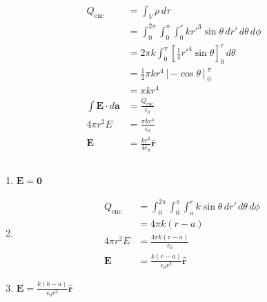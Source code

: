 \documentclass{article}
\renewcommand{\vec}[1]{\boldsymbol{\mathbf{#1}}}
\newcommand{\uvec}[1]{\hat{\vec{#1}}}
\begin{document}
\subsection{}

\begin{align*}
  Q_\text{enc}                 & = \int_V \rho \,d \tau                                                             \\
                               & = \int_0^{2 \pi} \int_0^\pi \int_0^r k r'^3 \sin \theta \,d r' \,d \theta \,d \phi \\
                               & = 2 \pi k \int_0^\pi \left[ \frac{1}{4} r'^4 \sin \theta \right]_0^r \,d \theta    \\
                               & = \frac{1}{2} \pi k r^4 [-\cos \theta]_0^\pi                                       \\
                               & = \pi k r^4                                                                        \\
  \int \vec{E} \cdot d \vec{a} & = \frac{Q_\text{enc}}{\epsilon_0}                                                  \\
  4 \pi r^2 E                  & = \frac{\pi k r^4}{\epsilon_0}                                                     \\
  \vec{E}                      & = \frac{k r^2}{4 \epsilon_0} \uvec{r}
\end{align*}

\subsection{}

\begin{enumerate}
  \item $\vec{E} = \vec{0}$

  \item

        \begin{align*}
          Q_\text{enc} & = \int_0^{2 \pi} \int_0^\pi \int_a^r k \sin \theta \,d r' \,d \theta \,d \phi \\
                       & = 4 \pi k (r - a)                                                             \\
          4 \pi r^2 E  & = \frac{4 \pi k (r - a)}{\epsilon_0}                                          \\
          \vec{E}      & = \frac{k (r - a)}{\epsilon_0 r^2} \uvec{r}
        \end{align*}

  \item $\vec{E} = \frac{k (b - a)}{\epsilon_0 r^2} \uvec{r}$
\end{enumerate}
\end{document}
